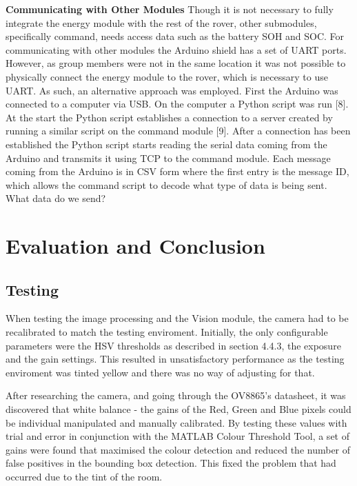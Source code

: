 \documentclass[a4paper]{article}
\begin{document}
\textbf{Communicating with Other Modules}
\vspace{10pt} 
\newline
Though it is not necessary to fully integrate the energy module with the rest of 
the rover, other submodules, specifically command, needs access data such as the 
battery SOH and SOC. For communicating with other modules the Arduino shield has 
a set of UART ports. However, as group members were not in the same location it 
was not possible to physically connect the energy module to the rover, which is 
necessary to use UART. As such, an alternative approach was employed. First the 
Arduino was connected to a computer via USB. On the computer a Python script was 
run [8]. At the start the Python script establishes a connection to a server 
created by running a similar script on the command module [9]. After a 
connection has been established the Python script starts reading the serial data 
coming from the Arduino and transmits it using TCP to the command module. Each 
message coming from the Arduino is in CSV form where the first entry is the 
message ID, which allows the command script to decode what type of data is being 
sent. What data do we send? 


\section{Evaluation and Conclusion}
\subsection{Testing}


    When testing the image processing and the Vision module, the camera had to 
    be recalibrated to match the testing enviroment. Initially, the only configurable
    parameters were the HSV thresholds as described in section 4.4.3, the exposure and
    the gain settings. This resulted in unsatisfactory performance as the testing enviroment
    was tinted yellow and there was no way of adjusting for that. 

    After researching the camera, and going through the OV8865's datasheet, \cite{OV8865DataSheet} it was discovered
    that white balance - the gains of the Red, Green and Blue pixels could be individual manipulated
    and manually calibrated. By testing these values with trial and error in conjunction with the 
    MATLAB Colour Threshold Tool, a set of gains were found that maximised the colour detection and
    reduced the number of false positives in the bounding box detection. This fixed the problem that 
    had occurred due to the tint of the room. 
\end{document}
